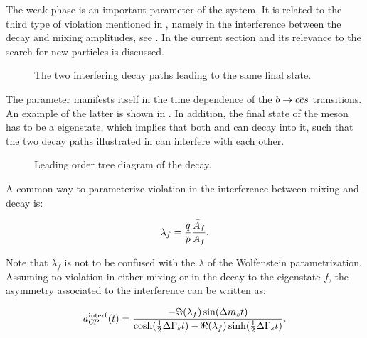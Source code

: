 The weak phase \phis is an important parameter of the \BBbarSyst system. It is related to the third
type of \CP violation mentioned in , namely in the interference between
the decay and mixing amplitudes, see . In the current section \phis and
its relevance to the search for new particles is discussed.

\newcommand{\ffig}{f}
\begin{figure}[h]
  \centering
  \resizebox{0.4\textwidth}{!}{}
  \caption{The two interfering decay paths leading to the same final state.}
  \label{interference}
\end{figure}

The parameter \phis manifests itself in the time dependence of the  $b \rightarrow c\overline {c}s $ transitions.
An example of the latter is shown in . In addition, the final state of the \Bs meson has to be
a \CP eigenstate, which implies that both \Bs and \Bsb can decay into it, such that the two decay paths
illustrated in  can interfere with each other.

\begin{figure}[!h]
  \centering
  {\sffamily }
  \caption{Leading order tree diagram of the \BsJpsiPhi decay.}
  \label{bs2jpsiphi}
\end{figure}

A common way to parameterize \CP violation in the interference between mixing and decay is:

\begin{equation}
  \centering
  \lambda_{f} = \frac{q}{p} \frac{\bar{A}_f}{A_f}. %
\label{lambda_cpv}
\end{equation}

\noindent Note that $\lambda_f$ is not to be confused with the $\lambda$ of the Wolfenstein parametrization.
Assuming no \CP violation in either \BBbarSyst mixing or in the decay to the \CP eigenstate $f$, the asymmetry
associated to the interference can be written as:

\newcommand{\half}{\frac{1}{2}}
\begin{equation}
  \centering
  a_{\CP}^{\rm interf}(t) = \frac{ - \Im(\lambda_f) \sin(\Delta m_s t)} {\cosh(\half \Delta\Gamma_s t) - \Re(\lambda_f)\sinh(\half\Delta\Gamma_s t)}.
\label{cpv_interf}
\end{equation}

